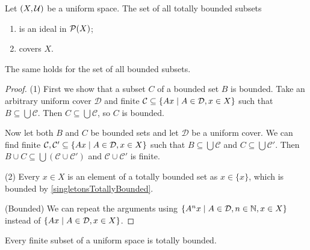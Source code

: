 \begin{lemma} \label{boundedSetsIdeal}
Let $\left( X,\mathcal{U} \right)$ be a uniform space. The set of all totally bounded subsets
\begin{enumerate}
\item is an ideal in $\operatorname{\mathcal{P}}(X)$;
\item covers $X$.
\end{enumerate}
The same holds for the set of all bounded subsets.
\end{lemma}
\begin{proof}
(1) First we show that a subset $C$ of a bounded set $B$ is bounded. Take an arbitrary uniform cover $\mathcal{D}$ and finite $\mathcal{C}\subseteq \left\{ Ax \;\middle|\; A\in \mathcal{D}, x\in X \right\}$ such that $B\subseteq \bigcup \mathcal{C}$. Then $C\subseteq \bigcup \mathcal{C}$, so $C$ is bounded.

Now let both $B$ and $C$ be bounded sets and let $\mathcal{D}$ be a uniform cover. We can find finite $\mathcal{C}, \mathcal{C}'\subseteq \left\{ Ax \;\middle|\; A\in \mathcal{D}, x\in X \right\}$ such that $B\subseteq \bigcup \mathcal{C}$ and $C\subseteq \bigcup \mathcal{C}'$. Then $B\cup C \subseteq \bigcup (\mathcal{C}\cup \mathcal{C}')$ and $\mathcal{C}\cup \mathcal{C}'$ is finite.

(2) Every $x\in X$ is an element of a totally bounded set as $x\in \{x\}$, which is bounded by \ref{singletonsTotallyBounded}.

(Bounded) We can repeat the arguments using $\left\{ A^nx \;\middle|\; A\in \mathcal{D}, n\in\mathbb{N}, x\in X \right\}$ instead of $\left\{ Ax \;\middle|\; A\in \mathcal{D}, x\in X \right\}$.
\end{proof}
\begin{corollary}
Every finite subset of a uniform space is totally bounded.
\end{corollary}

